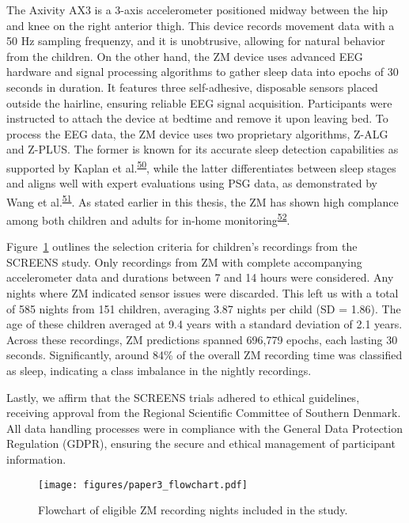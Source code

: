 \documentclass[
  10pt,
]{scrbook}
\begin{document}
The Axivity AX3 is a 3-axis accelerometer positioned midway between the
hip and knee on the right anterior thigh. This device records movement
data with a 50 Hz sampling frequenzy, and it is unobtrusive, allowing
for natural behavior from the children. On the other hand, the ZM device
uses advanced EEG hardware and signal processing algorithms to gather
sleep data into epochs of 30 seconds in duration. It features three
self-adhesive, disposable sensors placed outside the hairline, ensuring
reliable EEG signal acquisition. Participants were instructed to attach
the device at bedtime and remove it upon leaving bed. To process the EEG
data, the ZM device uses two proprietary algorithms, Z-ALG and Z-PLUS.
The former is known for its accurate sleep detection capabilities as
supported by Kaplan et
al.\textsuperscript{\protect\hyperlink{ref-kaplan_performance_2014}{50}},
while the latter differentiates between sleep stages and aligns well
with expert evaluations using PSG data, as demonstrated by Wang et
al.\textsuperscript{\protect\hyperlink{ref-wang_evaluation_2015}{51}}.
As stated earlier in this thesis, the ZM has shown high complance among
both children and adults for in-home
monitoring\textsuperscript{\protect\hyperlink{ref-pedersen_self-administered_2021}{52}}.

Figure~\ref{fig-paper3_flow} outlines the selection criteria for
children's recordings from the SCREENS study. Only recordings from ZM
with complete accompanying accelerometer data and durations between 7
and 14 hours were considered. Any nights where ZM indicated sensor
issues were discarded. This left us with a total of 585 nights from 151
children, averaging 3.87 nights per child (SD = 1.86). The age of these
children averaged at 9.4 years with a standard deviation of 2.1 years.
Across these recordings, ZM predictions spanned 696,779 epochs, each
lasting 30 seconds. Significantly, around 84\% of the overall ZM
recording time was classified as sleep, indicating a class imbalance in
the nightly recordings.

Lastly, we affirm that the SCREENS trials adhered to ethical guidelines,
receiving approval from the Regional Scientific Committee of Southern
Denmark. All data handling processes were in compliance with the General
Data Protection Regulation (GDPR), ensuring the secure and ethical
management of participant information.

\begin{figure}

{\centering \texttt{[image: figures/paper3\_flowchart.pdf]}

}

\caption{\label{fig-paper3_flow}Flowchart of eligible ZM recording
nights included in the study.}

\end{figure}
\end{document}
